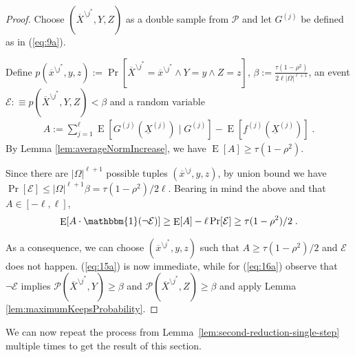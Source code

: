 \documentclass{daj}
\newcommand{\1}{\mathbbm{1}}
\theoremstyle{plain}
\theoremstyle{definition}
\DeclareMathOperator*{\EE}{E}
\newcommand{\cE}{\mathcal{E}}
\begin{document}
\begin{proof}
Choose $(\overline{X}^{\setminus j^*}, Y, Z)$ as a double sample
from $\mathcal{P}$ and let $G^{(j)}$ be defined as in
(\ref{eq:9a}).

Define 
$p(\overline{x}^{\setminus j^*}, y, z) := 
\Pr[\overline{X}^{\setminus j^*} = \overline{x}^{\setminus j^*} \land
Y = y \land Z = z]$,
$\beta := \frac{\tau(1-\rho^2)}{2\ell|\Omega|^{\ell+1}}$,
an event $\cE :\equiv p(\overline{X}^{\setminus j^*}, Y, Z) < \beta$
and a random variable
\begin{align*}
A := \sum_{j=1}^\ell \EE[ G^{(j)}(\underline{X}^{(j)}) \mid G^{(j)} ] - 
\EE[ f^{(j)}(\underline{X}^{(j)})] \; .
\end{align*}
By Lemma \ref{lem:averageNormIncrease}, we have $\EE[A] \ge \tau(1-\rho^2)$.

Since there are $|\Omega|^{\ell+1}$ possible tuples
$(\overline{x}^{\setminus j}, y, z)$, by union bound we have
$\Pr[\cE] \le |\Omega|^{\ell+1}\beta = \tau(1-\rho^2)/2\ell$.
Bearing in mind the above and that
$A \in [-\ell, \ell]$,
\begin{align*}
\EE[A \cdot \1(\lnot \cE)]
\ge 
\EE[A] - \ell\Pr[\cE]
\ge
\tau (1-\rho^2)/2 \; .
\end{align*}

As a consequence, we can choose $(\overline{x}^{\setminus j^*}, y ,z)$
such that $A \ge \tau(1-\rho^2)/2$ and
$\cE$ does not happen. (\ref{eq:15a}) is now immediate, while for
(\ref{eq:16a}) observe that $\lnot \cE$ implies
$\mathcal{P}(\overline{X}^{\setminus j^*}, Y) \ge \beta$
and $\mathcal{P}(\overline{X}^{\setminus j^*}, Z) \ge \beta$
and apply Lemma
\ref{lem:maximumKeepsProbability}.
\end{proof}

We can now repeat the process from Lemma~\ref{lem:second-reduction-single-step}
multiple times to get the result of this section.
\end{document}
